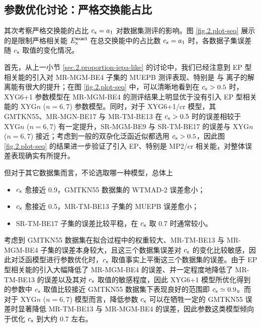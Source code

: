 \subsection{参数优化讨论：严格交换能占比}
\label{sec.2.proportion-exchange}

其次考察严格交换能的占比 $c_{\textsf{x}} = a_1$ 对数据集测评的影响。图 \ref{fig.2.plot-seq} 展示的是限制严格相关能 $E_{\textsf{x}}^{\textsf{exact}}$ 在总交换能中的占比数 $c_{\textsf{x}} = a_1$ 时，各数据子集误差随 $c_{\textsf{x}}$ 取值的变化情况。

首先，从上一小节 \ref{sec.2.proportion-iepa-like} 的讨论中，我们已经注意到 EP 型相关能的引入对 MR-MGM-BE4 子集的 MUEPB 测评表现、特别是  与  离子的解离能有很大的提升；在图 \ref{fig.2.plot-seq} 中，可以清晰地看到在 $c_{\textsf{x}} > 0.5$ 时，XYG6+1 参数模型在 MR-MGM-BE4 的测评结果上明显优于没有引入 EP 型相关能的 XYG$n$ ($n=6,7$) 参数模型。同时，对于 XYG6+1/cr 模型，其 GMTKN55、MR-MGN-BE17 与 MR-TM-BE13 在 $c_{\textsf{x}} > 0.5$ 时的误差相较于 XYG$n$ ($n=6,7$) 有一定提升，SR-MGM-BE9 与 SR-TM-BE17 的误差与 XYG$n$ ($n=6,7$) 接近；考虑到一般的双杂化泛函近似都选用 $c_{\textsf{x}} > 0.5$，因此图 \ref{fig.2.plot-seq} 的结果进一步验证了引入 EP、特别是 MP2/cr 相关能，对整体误差表现确实有所提升。

但对于其它数据集而言，不论选取哪一种模型，总体上
\begin{itemize}[nosep]
  \item $c_{\textsf{x}}$ 愈接近 0.9，GMTKN55 数据集的 WTMAD-2 误差愈小；
  \item $c_{\textsf{x}}$ 愈接近 0.5，MR-TM-BE13 子集的 MUEPB 误差愈小；
  \item SR-TM-BE17 子集的误差比较平稳，在 $c_{\textsf{x}}$ 取 0.7 时通常较小。
\end{itemize}
考虑到 GMTKN55 数据集在拟合过程中的权重较大、MR-TM-BE13 与 MR-MGM-BE4 子集的误差本身较大，且这三个数据集误差对 $c_{\textsf{x}}$ 的变化比较敏感，因此对泛函模型进行参数优化时，$c_{\textsf{x}}$ 取值事实上平衡这三个数据集的误差。由于 EP 型相关能的引入大幅降低了 MR-MGM-BE4 的误差、并一定程度地降低了 MR-TM-BE13 的误差以及其对 $c_{\textsf{x}}$ 取值的敏感程度，因此 XYG6+1 模型所优化得到的参数中 $c_{\textsf{x}}$ 取值比较接近 GMTKN55 数据集下表现良好的范围即 $c_{\textsf{x}} \simeq 0.9$。而对于 XYG$n$ ($n=6,7$) 模型而言，降低参数 $c_{\textsf{x}}$ 可以在牺牲一定的 GMTKN55 误差时显著降低 MR-TM-BE13 与 MR-MGM-BE4 的误差，因此参数这类模型倾向于优化 $c_{\textsf{x}}$ 到大约 0.7 左右。

